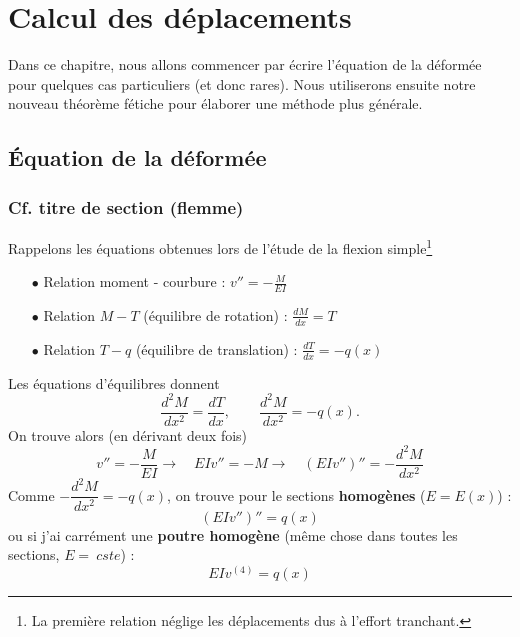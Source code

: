 \chapter{Calcul des déplacements}
Dans ce chapitre, nous allons commencer par écrire l'équation de la déformée 
pour quelques cas particuliers (et donc rares). Nous utiliserons ensuite notre 
nouveau théorème fétiche pour élaborer une méthode plus générale.

\section{Équation de la déformée}
	\subsection{Cf. titre de section (flemme)}
	Rappelons les équations obtenues lors de l'étude de la flexion simple\footnote{
	La première relation néglige les déplacements dus à l'effort tranchant.}
	\begin{itemize}
	\item[$\bullet$] Relation moment - courbure : $v'' = -\frac{M}{EI}$
	\item[$\bullet$] Relation $M-T$ (équilibre de rotation) : $\frac{dM}{dx}=T$
	\item[$\bullet$] Relation $T-q$ (équilibre de translation) : $\frac{dT}{dx}
	=-q(x)$
	\end{itemize}
	Les équations d'équilibres donnent 
	\begin{equation}
	\dfrac{d^2M}{dx^2} = \dfrac{dT}{dx},\qquad \dfrac{d^2M}{dx^2}=-q(x).
	\end{equation}
	On trouve alors (en dérivant deux fois)
	\begin{equation}
	v'' = -\dfrac{M}{EI} \longrightarrow \quad EIv'' = -M\longrightarrow \quad 
	(EIv'')'' = -\dfrac{d^2M}{dx^2}
	\end{equation}
	Comme $-\dfrac{d^2M}{dx^2} = -q(x)$, on trouve pour le sections 
	\textbf{homogènes} ($E=E(x)$) :
	\begin{equation}
	(EIv'')'' = q(x)
	\end{equation}
	ou si j'ai carrément une \textbf{poutre homogène} (même chose dans toutes 
	les sections, $E =\ cste$) :
	\begin{equation}
	EIv^{(4)} = q(x)
	\end{equation}
	
